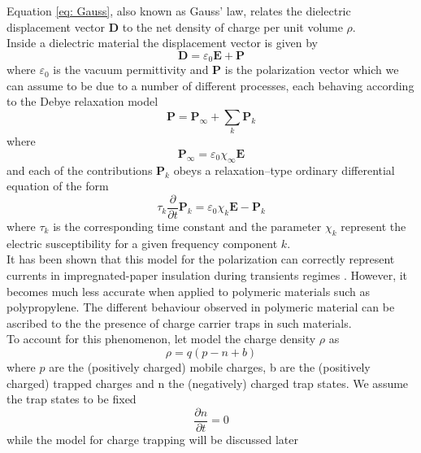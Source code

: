 \documentclass{Configuration_Files/PoliMi3i_thesis}
\let\epsilon\varepsilon
\begin{document}
Equation \ref{eq: Gauss}, also known as Gauss' law, relates the dielectric displacement vector $\bm{D}$ to the net density of charge per unit volume $\rho$. 
\\Inside a dielectric material the displacement vector is given by
\begin{equation}
    \label{eq: dielectric}
    \bm{D}=\epsilon_0 \bm{E} +\bm{P}
\end{equation}
where $\epsilon_0$ is the vacuum permittivity and  $\bm{P}$ is the polarization vector which we can assume to be due to a number of different processes, each behaving according to the Debye relaxation model \cite{Debye}
\begin{equation}
    \label{eq: Debye}
    \bm{P}=\bm{P}_\infty + \sum_k \bm{P}_k
\end{equation}
where
\begin{equation}
    \label{eq: Debye 2}
    \bm{P}_\infty = \epsilon_0\chi_\infty\bm{E}
\end{equation}
and each of the contributions $\bm{P}_k$ obeys a relaxation–type ordinary differential equation of the form
\begin{equation}
    \label{eq: Debye 3}
    \tau_k\frac{\partial}{\partial t}\bm{P}_k = \epsilon_0\chi_k\bm{E}-\bm{P}_k
\end{equation}
where $\tau_k$ is the corresponding time constant and the parameter $\chi_k$ represent the electric susceptibility for a given frequency component $k$.
\\It has been shown that this model for the polarization can correctly represent currents in impregnated-paper  insulation during  transients regimes \cite{Cambieri}. However, it becomes much less accurate when applied to polymeric materials such as polypropylene. The different behaviour observed in polymeric material can be ascribed to the the presence of charge carrier traps in such materials. \\To account for this phenomenon, let model the charge density $\rho$ as 
\begin{equation}
    \label{eq: rho}
    \rho=q(p-n+b)
\end{equation}
where $p$ are the (positively charged) mobile charges, b are the (positively charged) trapped charges and n the (negatively) charged trap states. We assume the trap states to be fixed 
\begin{equation}
    \label{eq: n}
    \frac{\partial n}{\partial t}=0
\end{equation}
while the model for charge trapping will be discussed later
\end{document}

